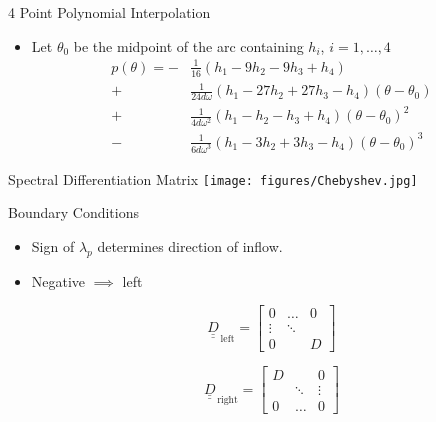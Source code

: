 \documentclass{beamer}
\newcommand{\bunderline}[1]{\underline{#1}}
\newcommand{\mat}[1]{{\bunderline{\bunderline{#1}}}}
\begin{document}
\begin{frame}{4 Point Polynomial Interpolation}
\begin{itemize}
    \item
        Let $\theta_0$ be the midpoint of the arc containing $h_i$, $i=1,\dots,4$ 
\begin{align*}
    p(\theta) = - &\frac{1}{16}(h_1 - 9h_2 - 9h_3 + h_4) \\
    + &\frac{1}{24d\omega}(h_1 - 27h_2 + 27h_3 - h_4)(\theta - \theta_0) \\
    + &\frac{1}{4d\omega^2}(h_1 - h_2 - h_3 + h_4)(\theta - \theta_0)^2 \\
    - &\frac{1}{6d\omega^3}(h_1 - 3h_2 + 3h_3 - h_4)(\theta - \theta_0)^3
\end{align*}
\end{itemize}
\end{frame}

\begin{frame}{Spectral Differentiation Matrix}
    \centering
    \texttt{[image: figures/Chebyshev.jpg]}
\end{frame}

\begin{frame}{Boundary Conditions}
\begin{itemize}
    \item
        Sign of $\lambda_p$ determines direction of inflow. 
    \item Negative $\implies$ left
        
    \begin{minipage}[c]{0.5\linewidth}
      \[
        \mat{D}_{\,\text{left}} = \left[
        \begin{array}{c|cc}
          0 & \dots & 0 \\ \hline
          \vdots & \ddots &  \\
          0 & & D
        \end{array}
        \right]
      \]
    \end{minipage}
    \begin{minipage}[c]{0.4\linewidth}
      \[
        \mat{D}_{\,\text{right}} = \left[
        \begin{array}{cc|c}
          D &  & 0 \\ 
            & \ddots & \vdots \\\hline
          0 & \dots & 0
        \end{array}
        \right]
      \]
    \end{minipage}
\end{itemize}
\end{frame}
\end{document}
